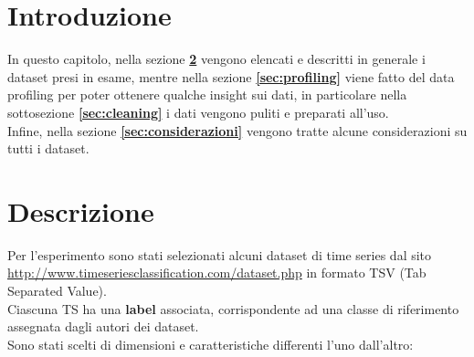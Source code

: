 \section{Introduzione}
In questo capitolo, nella sezione \textbf{\ref{sec:descrizione}} vengono elencati e descritti in generale i dataset presi in esame, mentre nella sezione \textbf{\ref{sec:profiling}} viene fatto del data profiling per poter ottenere qualche insight sui dati, in particolare nella sottosezione \textbf{\ref{sec:cleaning}} i dati vengono puliti e preparati all'uso.\\
Infine, nella sezione \textbf{\ref{sec:considerazioni}} vengono tratte alcune considerazioni su tutti i dataset.

\section{Descrizione} \label{sec:descrizione}
Per l'esperimento sono stati selezionati alcuni dataset di time series dal sito \url{http://www.timeseriesclassification.com/dataset.php} in formato TSV (Tab Separated Value).\\
Ciascuna TS ha una \textbf{label} associata, corrispondente ad una classe di riferimento assegnata dagli autori dei dataset.\\
Sono stati scelti di dimensioni e caratteristiche differenti l'uno dall'altro:
